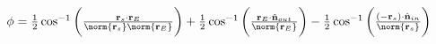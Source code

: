 \documentclass[crop=false,class=article,oneside]{standalone}
\begin{document}
        \begin{theorem}
            $\phi%
             =\frac{1}{2}\cos^{-1}%
                 \bigg(%
                     \frac{%
                         \mathbf{r}_{s}\cdot%
                         \mathbf{r}_{E}%
                     }{%
                         \norm{\mathbf{r}_{s}}%
                         \norm{\mathbf{r}_{E}}}%
                 \bigg)%
             +\frac{1}{2}\cos^{-1}%
                 \bigg(%
                     \frac{%
                         \mathbf{r}_{E}\cdot%
                         \hat{\mathbf{n}}_{out}%
                     }{%
                         \norm{\mathbf{r}_{E}}}%
                 \bigg)%
             -\frac{1}{2}\cos^{-1}%
                  \bigg(%
                      \frac{%
                          (-\mathbf{r}_{s})\cdot%
                          \hat{\mathbf{n}}_{in}%
                      }{\norm{\mathbf{r}_{s}}}%
                  \bigg)$
        \end{theorem}
\end{document}
